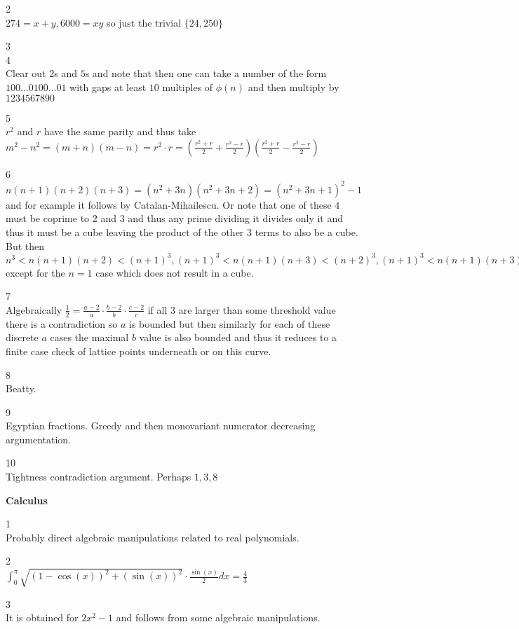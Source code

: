 2 \\
$274=x+y,6000=xy$ so just the trivial $\{ 24,250 \}$

3 \\


4 \\
Clear out $2$s and $5$s and note that then one can take a number of the form $100\dots 0100\dots 01$ with gaps at least $10$ multiples of $\phi(n)$ and then multiply by $1234567890$

5 \\
$r^2$ and $r$ have the same parity and thus take $m^2-n^2=(m+n)(m-n)=r^2\cdot r=\left(\frac{r^2+r}{2}+\frac{r^2-r}{2} \right) \left(\frac{r^2+r}{2}-\frac{r^2-r}{2} \right)$

6 \\
$n(n+1)(n+2)(n+3)=(n^2+3n)(n^2+3n+2)=(n^2+3n+1)^2-1$ and for example it follows by Catalan-Mihailescu. Or note that one of these $4$ must be coprime to $2$ and $3$ and thus any prime dividing it divides only it and thus it must be a cube leaving the product of the other $3$ terms to also be a cube. But then $n^3 < n(n+1)(n+2) < (n+1)^3, (n+1)^3 < n(n+1)(n+3) < (n+2)^3, (n+1)^3 < n(n+1)(n+3) < (n+2)^3$ except for the $n=1$ case which does not result in a cube.

7 \\
Algebraically $\frac{1}{2}=\frac{a-2}{a} \cdot \frac{b-2}{b} \cdot \frac{c-2}{c}$ if all $3$ are larger than some threshold value there is a contradiction so $a$ is bounded but then similarly for each of these discrete $a$ cases the maximal $b$ value is also bounded and thus it reduces to a finite case check of lattice points underneath or on this curve.

8 \\
Beatty.

9 \\
Egyptian fractions. Greedy and then monovariant numerator decreasing argumentation.

10 \\
Tightness contradiction argument. Perhaps $1,3,8$

\newpage

\textbf{Calculus}

1 \\
Probably direct algebraic manipulations related to real polynomials.

2 \\
$\int_0^{\pi} \sqrt{(1-\cos(x))^2+(\sin(x))^2} \cdot \frac{\sin(x)}{2} dx=\boxed{\frac{4}{3}}$

3 \\
It is obtained for $2x^2-1$ and follows from some algebraic manipulations.


